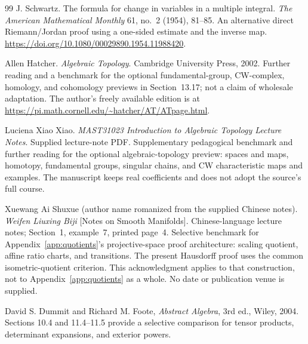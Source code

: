 \begin{thebibliography}{99}
J. Schwartz. The formula for change in variables in a multiple integral.
\emph{The American Mathematical Monthly} 61, no.~2 (1954), 81--85.
\newblock An alternative direct Riemann/Jordan proof using a one-sided
estimate and the inverse map.
\url{https://doi.org/10.1080/00029890.1954.11988420}.

Allen Hatcher. \emph{Algebraic Topology}. Cambridge University Press, 2002.
\newblock Further reading and a benchmark for the optional fundamental-group,
CW-complex, homology, and cohomology previews in Section~13.17;
not a claim of wholesale adaptation. The author's freely available edition
is at \url{https://pi.math.cornell.edu/~hatcher/AT/ATpage.html}.

Luciena Xiao Xiao. \emph{MAST31023 Introduction to Algebraic Topology
Lecture Notes}. Supplied lecture-note PDF.
\newblock Supplementary pedagogical benchmark and further reading for the
optional algebraic-topology preview: spaces and maps, homotopy, fundamental
groups, singular chains, and CW characteristic maps and examples. The
manuscript keeps real coefficients and does not adopt the source's full course.

Xuewang Ai Shuxue (author name romanized from the supplied Chinese notes).
\emph{Weifen Liuxing Biji} [Notes on Smooth Manifolds]. Chinese-language
lecture notes; Section~1, example~7, printed page~4.
\newblock Selective benchmark for Appendix~\ref{app:quotients}'s projective-space proof
architecture: scaling quotient, affine ratio charts, and transitions.
The present Hausdorff proof uses the common isometric-quotient criterion.
This acknowledgment applies to that construction,
not to Appendix~\ref{app:quotients} as a whole. No date or publication venue is supplied.

David S. Dummit and Richard M. Foote,
\emph{Abstract Algebra}, 3rd ed., Wiley, 2004.
Sections 10.4 and 11.4--11.5 provide a selective comparison for tensor
products, determinant expansions, and exterior powers.

\end{thebibliography}


